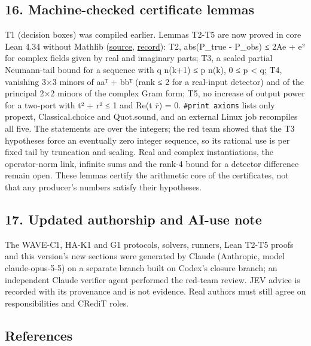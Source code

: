 \documentclass[
  10pt,
]{article}
\begin{document}
\hypertarget{machine-checked-certificate-lemmas}{%
\subsection{16. Machine-checked certificate
lemmas}\label{machine-checked-certificate-lemmas}}

T1 (decision boxes) was compiled earlier. Lemmas T2-T5 are now proved in
core Lean 4.34 without Mathlib
(\href{https://github.com/Agnuxo1/Neuro3D/blob/ceb4bd3188d0268deb7cdcec2d1396467956b411/Lean/closure-core/Bounds.lean}{source},
\href{https://github.com/Agnuxo1/Neuro3D/blob/ceb4bd3188d0268deb7cdcec2d1396467956b411/Docs/closure-20261012/claude/lean-bounds.json}{record}):
T2, abs(P\_true - P\_obs) ≤ 2Ae + e² for complex fields given by real
and imaginary parts; T3, a scaled partial Neumann-tail bound for a
sequence with q n(k+1) ≤ p n(k), 0 ≤ p \textless{} q; T4, vanishing 3×3
minors of aaᵀ + bbᵀ (rank ≤ 2 for a real-input detector) and of the
principal 2×2 minors of the complex Gram form; T5, no increase of output
power for a two-port with \textbar t\textbar² + \textbar r\textbar² ≤ 1
and Re(t \(\bar{r}\)) = 0. \texttt{\#print\ axioms} lists only propext,
Classical.choice and Quot.sound, and an external Linux job recompiles
all five. The statements are over the integers; the red team showed that
the T3 hypotheses force an eventually zero integer sequence, so its
rational use is per fixed tail by truncation and scaling. Real and
complex instantiations, the operator-norm link, infinite sums and the
rank-4 bound for a detector difference remain open. These lemmas certify
the arithmetic core of the certificates, not that any producer's numbers
satisfy their hypotheses.

\hypertarget{updated-authorship-and-ai-use-note}{%
\subsection{17. Updated authorship and AI-use
note}\label{updated-authorship-and-ai-use-note}}

The WAVE-C1, HA-K1 and G1 protocols, solvers, runners, Lean T2-T5 proofs
and this version's new sections were generated by Claude (Anthropic,
model claude-opus-5-5) on a separate branch built on Codex's closure
branch; an independent Claude verifier agent performed the red-team
review. JEV advice is recorded with its provenance and is not evidence.
Real authors must still agree on responsibilities and CRediT roles.

\hypertarget{references}{%
\subsection*{References}\label{references}}
\end{document}
